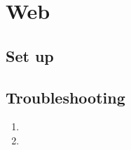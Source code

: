   \section{Web}
  \subsection{Set up}
    \begin{enumerate}
      \item

      \item

      \item
    \end{center}


    \end{enumerate}

  \subsection{Troubleshooting}

  \begin{enumerate}
    \item
    \item
  \end{enumerate}
